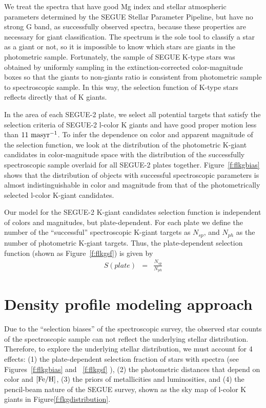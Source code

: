 \documentclass[12pt,preprint]{aastex}
\newcommand{\feh}{{\rm [Fe/H]}}
\begin{document}
 We treat the spectra that have good Mg index and stellar atmospheric parameters determined by the SEGUE Stellar Parameter Pipeline\citep[SSPP;][]{Lee2008a,Lee2008b,Lee2011}, but have no strong G band, as successfully observed spectra, because these properties are necessary for giant classification. The spectrum is the sole tool to classify a star as a giant or not, so it is impossible to know which stars are giants in the photometric sample. Fortunately, the sample of SEGUE K-type stars was obtained by uniformly sampling in the extinction-corrected color-magnitude boxes so that the giants to non-giants ratio is consistent from photometric sample to spectroscopic sample. In this way, the selection function of K-type stars reflects directly that of K giants.

In the area of each SEGUE-2 plate, we select all potential targets that satisfy the selection criteria of SEGUE-2 l-color K giants and have good proper motion less than $\rm 11~masyr^{-1}$. To infer the dependence on color and apparent magnitude of the selection function, we look at the distribution of the photometric K-giant candidates in color-magnitude space with the distribution of the successfully spectroscopic sample overlaid for all SEGUE-2 plates together. Figure~\ref{f:flkgbias} shows that the distribution of objects with successful spectroscopic parameters is almost indistinguishable in color and magnitude from that of the photometrically selected l-color K-giant candidates.

Our model for the SEGUE-2 K-giant candidates selection function is independent of colors and magnitudes, but plate-dependent. For each plate we define the number of the ``successful'' spectroscopic K-giant targets as $N_{sp}$, and $N_{ph}$ as the number of photometric K-giant targets. Thus, the plate-dependent selection function (shown as Figure~\ref{f:flkgsf}) is given by
\begin{eqnarray}
S(plate) &=& \frac{N_{sp}}{N_{ph}}   
 \end{eqnarray}

\section{Density profile modeling approach}
Due to the ``selection biases'' of the spectroscopic survey, the observed star counts of the spectroscopic sample can not reflect the underlying stellar distribution. Therefore, to explore the underlying stellar distribution, we must account for 4 effects: (1) the plate-dependent selection fraction of stars with spectra (see Figures~\ref{f:flkgbias} and ~\ref{f:flkgsf} ), (2) the photometric distances that depend on color and $\rm \feh$, (3) the priors of metallicities and luminosities, and (4) the pencil-beam nature of the SEGUE survey, shown as the sky map of l-color K giants in Figure\ref{f:fkgdistribution}. 
\end{document}

